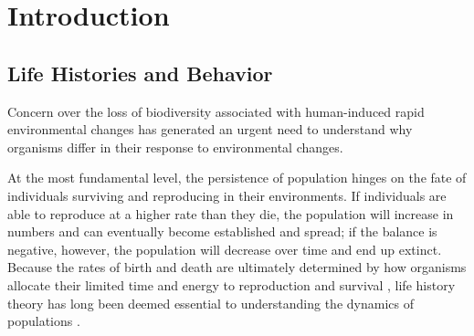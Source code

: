 \chapter{Introduction}\label{ch:intro}

\section{Life Histories and Behavior}

Concern over the loss of biodiversity associated with human-induced rapid 
environmental changes has generated an urgent need to understand why organisms 
differ in their response to environmental changes. 

At the most fundamental level, the persistence of population hinges on the fate 
of individuals surviving and reproducing in their environments. If individuals 
are able to reproduce at a higher rate than they die, the population will 
increase in numbers and can eventually become established and spread; if the 
balance is negative, however, the population will decrease over time and end up 
extinct. Because the rates of birth and death are ultimately determined by how 
organisms allocate their limited time and energy to reproduction and survival 
\citep{stearns1992evolution}, life history theory has long been 
deemed essential to understanding the dynamics of populations 
\citep{Saether2004, Sol2012a}.

